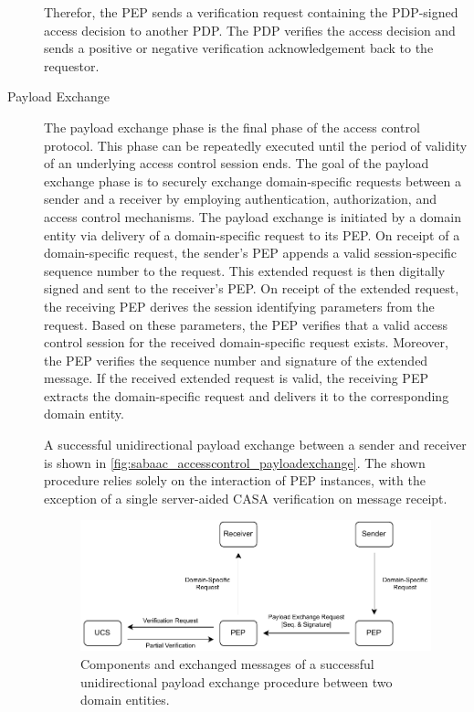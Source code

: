 \begin{description}
    Therefor, the PEP sends a verification request containing the PDP-signed access decision to another PDP.
    The PDP verifies the access decision and sends a positive or negative verification acknowledgement back to the requestor.
    \item[Payload Exchange] The payload exchange phase is the final phase of the access control protocol.
    This phase can be repeatedly executed until the period of validity of an underlying access control session ends.
    The goal of the payload exchange phase is to securely exchange domain-specific requests between a sender and a receiver by employing authentication, authorization, and access control mechanisms.
    The payload exchange is initiated by a domain entity via delivery of a domain-specific request to its PEP.
    On receipt of a domain-specific request, the sender's PEP appends a valid session-specific sequence number to the request.
    This extended request is then digitally signed and sent to the receiver's PEP.
    On receipt of the extended request, the receiving PEP derives the session identifying parameters from the request.
    Based on these parameters, the PEP verifies that a valid access control session for the received domain-specific request exists.
    Moreover, the PEP verifies the sequence number and signature of the extended message.
    If the received extended request is valid, the receiving PEP extracts the domain-specific request and delivers it to the corresponding domain entity.

    A successful unidirectional payload exchange between a sender and receiver is shown in \autoref{fig:sabaac_accesscontrol_payloadexchange}.
    The shown procedure relies solely on the interaction of PEP instances, with the exception of a single server-aided CASA verification on message receipt.
    \begin{figure}
        \centering
        \includegraphics[width=1.0\linewidth]{figures/SABAAC_protocols_accesscontrol_payloadexchange.drawio.pdf}
        \caption{Components and exchanged messages of a successful unidirectional payload exchange procedure between two domain entities.
        }
        \label{fig:sabaac_accesscontrol_payloadexchange}
    \end{figure}
    

\end{description}
